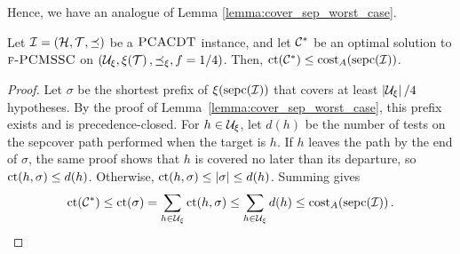 Hence, we have an analogue of Lemma \ref{lemma:cover_sep_worst_case}.
\begin{lemma}\label{lemma:cover_sep_average_case}
    Let $\mathcal{I}=\mathopen{}\left( \mathcal{H},\mathcal{T},\preceq \right)$ be a $\textup{\textsc{PCACDT}}$ instance, and let $\mathcal{C}^*$ be an optimal solution to $\textup{\textsc{f-PCMSSC}}$ on $\mathopen{}\left( \mathcal{U}_{\xi},\xi\mathopen{}\left( \mathcal{T} \right),\preceq_{\xi},f=1/4 \right)$.
    Then, $\operatorname{ct}\mathopen{}\left( \mathcal{C}^* \right) \leq \operatorname{cost}_A\mathopen{}\left( \operatorname{sepc}\mathopen{}\left( \mathcal{I} \right) \right)$.
\end{lemma}
\begin{proof}
    Let $\sigma$ be the shortest prefix of $\xi(\operatorname{sepc}\mathopen{}\left( \mathcal{I} \right))$ that covers at least $\mathopen{}\left| \mathcal{U}_{\xi} \right|/4$ hypotheses. By the proof of Lemma~\ref{lemma:cover_sep_worst_case}, this prefix exists and is precedence-closed. For $h\in\mathcal{U}_{\xi}$, let $d(h)$ be the number of tests on the sepcover path performed when the target is $h$. If $h$ leaves the path by the end of $\sigma$, the same proof shows that $h$ is covered no later than its departure, so $\operatorname{ct}\mathopen{}\left( h,\sigma \right)\leq d(h)$. Otherwise, $\operatorname{ct}\mathopen{}\left( h,\sigma \right)\leq\mathopen{}\left| \sigma \right|\leq d(h)$. Summing gives
    \[
    \operatorname{ct}\mathopen{}\left( \mathcal{C}^* \right)\leq\operatorname{ct}\mathopen{}\left( \sigma \right)
    =\sum_{h\in\mathcal{U}_{\xi}}\operatorname{ct}\mathopen{}\left( h,\sigma \right)
    \leq\sum_{h\in\mathcal{U}_{\xi}}d(h)
    \leq\operatorname{cost}_A\mathopen{}\left( \operatorname{sepc}\mathopen{}\left( \mathcal{I} \right) \right).\qedhere
    \]
\end{proof}

